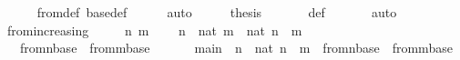 \begin{isabellebody}
\ \ \ \ \isamarkupfalse%
\ {\isasymDelta}{}{\isacharunderscore}{\kern0pt}from{\isacharunderscore}{\kern0pt}def\ {\isasymDelta}{}{\isacharunderscore}{\kern0pt}base{\isacharunderscore}{\kern0pt}def\isanewline
\ \ \ \ \isamarkupfalse%
\ auto\isanewline
\ \ \isamarkupfalse%
\ \isamarkupfalse%
\ {\isacharquery}{\kern0pt}thesis\ \isanewline
\ \ \ \ \isamarkupfalse%
\ {\isasymDelta}{}{\isacharunderscore}{\kern0pt}def\ \isanewline
\ \ \ \ \isamarkupfalse%
\ auto\isanewline
{}\isamarkupfalse%
%
\endisatagproof
{\isafoldproof}%
%
\isadelimproof
\isanewline
%
\endisadelimproof
\isanewline
{}\isamarkupfalse%
\ {\isasymDelta}{}{\isacharunderscore}{\kern0pt}from{\isacharunderscore}{\kern0pt}increasing\ {\isacharcolon}{\kern0pt}\ \isanewline
\ \ \ n\ m\ \isanewline
\ \ \ {\isachardoublequoteopen}n\ {\isasymin}\ nat{\isachardoublequoteclose}\ {\isachardoublequoteopen}m\ {\isasymin}\ nat{\isachardoublequoteclose}\ {\isachardoublequoteopen}n\ {\isasymle}\ m{\isachardoublequoteclose}\isanewline
\ \ \ {\isachardoublequoteopen}{\isasymDelta}{}{\isacharunderscore}{\kern0pt}from{\isacharcircum}{\kern0pt}n{\isacharparenleft}{\kern0pt}{\isasymDelta}{}{\isacharunderscore}{\kern0pt}base{\isacharparenright}{\kern0pt}\ {\isasymsubseteq}\ {\isasymDelta}{}{\isacharunderscore}{\kern0pt}from{\isacharcircum}{\kern0pt}m{\isacharparenleft}{\kern0pt}{\isasymDelta}{}{\isacharunderscore}{\kern0pt}base{\isacharparenright}{\kern0pt}{\isachardoublequoteclose}\ \isanewline
%
\isadelimproof
%
\endisadelimproof
%
\isatagproof
{}\isamarkupfalse%
{\isacharminus}{\kern0pt}\ \isanewline
\ \ \isamarkupfalse%
\ main\ {\isacharcolon}{\kern0pt}\ {\isachardoublequoteopen}{\isasymforall}n\ {\isasymin}\ nat{\isachardot}{\kern0pt}\ n\ {\isasymle}\ m\ {\isasymlongrightarrow}\ {\isasymDelta}{}{\isacharunderscore}{\kern0pt}from{\isacharcircum}{\kern0pt}n{\isacharparenleft}{\kern0pt}{\isasymDelta}{}{\isacharunderscore}{\kern0pt}base{\isacharparenright}{\kern0pt}\ {\isasymsubseteq}\ {\isasymDelta}{}{\isacharunderscore}{\kern0pt}from{\isacharcircum}{\kern0pt}m{\isacharparenleft}{\kern0pt}{\isasymDelta}{}{\isacharunderscore}{\kern0pt}base{\isacharparenright}{\kern0pt}{\isachardoublequoteclose}\ \isanewline
\ \ \ \ \isamarkupfalse%

\end{isabellebody}
